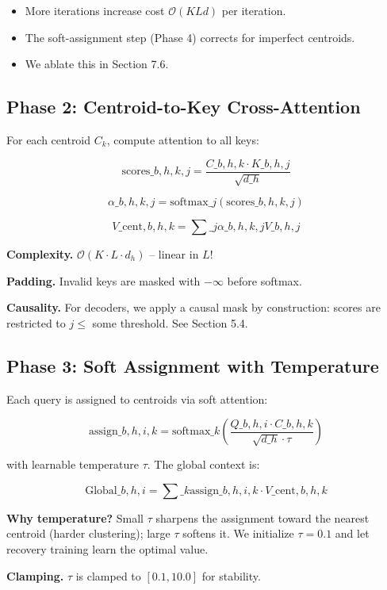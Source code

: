\begin{itemize}
\item More iterations increase cost $\mathcal{O}(K L d)$ per iteration.
\item The soft-assignment step (Phase 4) corrects for imperfect centroids.
\item We ablate this in Section 7.6.

\end{itemize}
\subsection{Phase 2: Centroid-to-Key Cross-Attention}

For each centroid $C_k$, compute attention to all keys:

\[
\text{scores}\_{b,h,k,j} = \frac{C\_{b,h,k} \cdot K\_{b,h,j}}{\sqrt{d\_h}}
\]

\[
\alpha\_{b,h,k,j} = \text{softmax}\_j(\text{scores}\_{b,h,k,j})
\]

\[
V\_{\text{cent}, b,h,k} = \sum\_j \alpha\_{b,h,k,j} V\_{b,h,j}
\]

\textbf{Complexity.} $\mathcal{O}(K \cdot L \cdot d_h)$ -- linear in $L$!

\textbf{Padding.} Invalid keys are masked with $-\infty$ before softmax.

\textbf{Causality.} For decoders, we apply a causal mask by construction: 
scores are restricted to $j \leq$ some threshold. See Section 5.4.

\subsection{Phase 3: Soft Assignment with Temperature}

Each query is assigned to centroids via soft attention:

\[
\text{assign}\_{b,h,i,k} = \text{softmax}\_k\!\left(\frac{Q\_{b,h,i} \cdot C\_{b,h,k}}{\sqrt{d\_h} \cdot \tau}\right)
\]

with learnable temperature $\tau$. The global context is:

\[
\text{Global}\_{b,h,i} = \sum\_k \text{assign}\_{b,h,i,k} \cdot V\_{\text{cent}, b,h,k}
\]

\textbf{Why temperature?} Small $\tau$ sharpens the assignment toward the 
nearest centroid (harder clustering); large $\tau$ softens it. We initialize 
$\tau = 0.1$ and let recovery training learn the optimal value.

\textbf{Clamping.} $\tau$ is clamped to $[0.1, 10.0]$ for stability.

